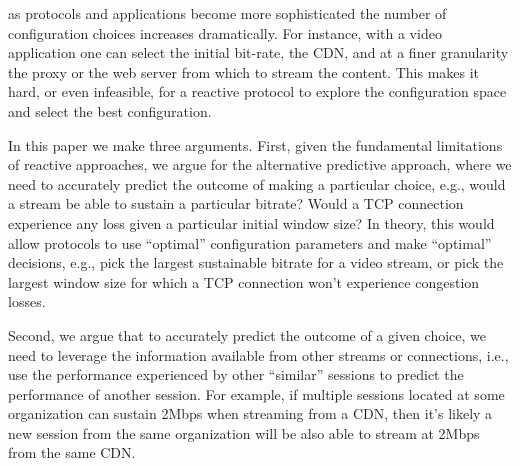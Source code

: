  as protocols and applications become more sophisticated the number of configuration choices increases dramatically. For instance, with a video application one can select the initial bit-rate, the CDN, and at a finer granularity the proxy or the web server from which to stream the content. This makes it hard, or even infeasible, for a reactive protocol to explore the configuration space and select the best configuration.



In this paper we make three arguments. First, given the fundamental limitations of reactive approaches, we argue for the alternative predictive approach, where we need to accurately predict the outcome of making a particular choice, e.g., would a stream be able to sustain a particular bitrate? Would a TCP connection experience any loss given a particular initial window size? In theory, this would allow protocols to use ``optimal'' configuration parameters and make ``optimal'' decisions, e.g., pick the largest sustainable bitrate for a video stream,  or pick the largest window size for which a TCP connection won't experience congestion losses.

Second, we argue that to accurately predict the outcome of a given choice, we need to leverage the information available from other streams or connections, i.e., use the performance experienced by other ``similar'' sessions to predict the performance of another session. For example, if multiple sessions located at some organization can sustain 2Mbps when streaming from a CDN, then it's likely a new session from the same organization will be also able to stream at 2Mbps from the same CDN. 

